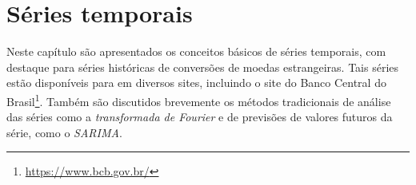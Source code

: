 
\chapter{Séries temporais}
\label{cap:series}

Neste capítulo são apresentados os conceitos básicos de séries temporais, com destaque para séries históricas de conversões de moedas estrangeiras. Tais séries estão disponíveis para  em diversos sites, incluindo o site do Banco Central do Brasil\footnote{\url{https://www.bcb.gov.br/}}. Também são discutidos brevemente os métodos tradicionais de análise das séries como a \emph{transformada de Fourier} e de previsões de valores futuros da série, como o \emph{SARIMA}.